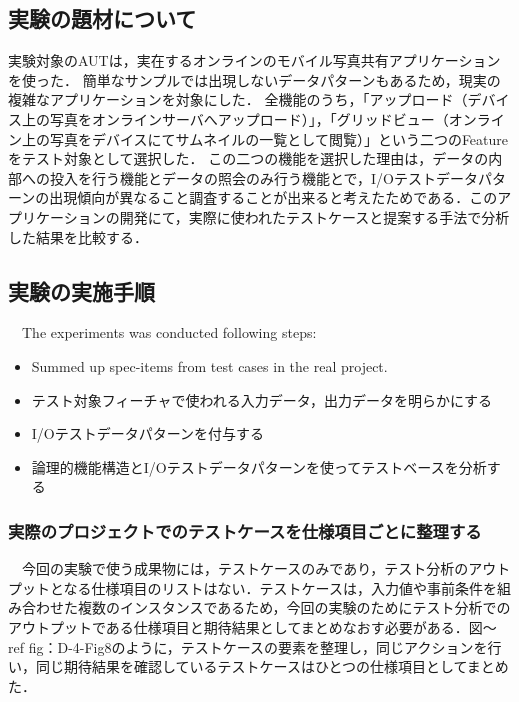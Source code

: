 \documentclass[a4paper,12pt]{jreport}
\begin{document}
\subsection{実験の題材について}
実験対象のAUTは，実在するオンラインのモバイル写真共有アプリケーションを使った．
簡単なサンプルでは出現しないデータパターンもあるため，現実の複雑なアプリケーションを対象にした．
全機能のうち，「アップロード（デバイス上の写真をオンラインサーバへアップロード）」，「グリッドビュー（オンライン上の写真をデバイスにてサムネイルの一覧として閲覧）」という二つのFeatureをテスト対象として選択した．
この二つの機能を選択した理由は，データの内部への投入を行う機能とデータの照会のみ行う機能とで，I/Oテストデータパターンの出現傾向が異なること調査することが出来ると考えたためである．このアプリケーションの開発にて，実際に使われたテストケースと提案する手法で分析した結果を比較する．

\subsection{実験の実施手順}

　The experiments was conducted following steps:


\begin{itemize}
\item Summed up spec-items from test cases in the real project.
\item テスト対象フィーチャで使われる入力データ，出力データを明らかにする
\item I/Oテストデータパターンを付与する
\item 論理的機能構造とI/Oテストデータパターンを使ってテストベースを分析する
\end{itemize}

\subsubsection{実際のプロジェクトでのテストケースを仕様項目ごとに整理する}
　今回の実験で使う成果物には，テストケースのみであり，テスト分析のアウトプットとなる仕様項目のリストはない．テストケースは，入力値や事前条件を組み合わせた複数のインスタンスであるため，今回の実験のためにテスト分析でのアウトプットである仕様項目と期待結果としてまとめなおす必要がある．図〜ref {fig：D-4-Fig8}のように，テストケースの要素を整理し，同じアクションを行い，同じ期待結果を確認しているテストケースはひとつの仕様項目としてまとめた．
\end{document}
